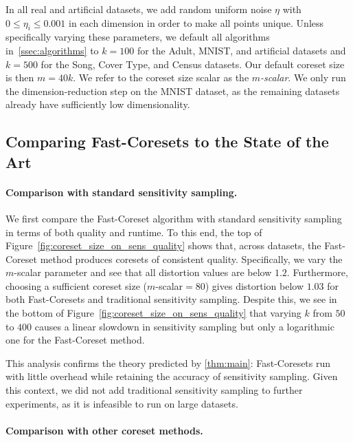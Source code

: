 In all real and artificial datasets, we add random uniform noise $\eta$ with $0 \leq \eta_i \leq 0.001$ in each dimension in order to make all points unique.
Unless specifically varying these parameters, we default all algorithms in~\ref{ssec:algorithms} to $k=100$ for the Adult, MNIST, and artificial datasets and
$k=500$ for the Song, Cover Type, and Census datasets. Our default coreset size is then $m = 40k$. We refer to the coreset size scalar as the \emph{$m$-scalar}.
We only run the dimension-reduction step on the MNIST dataset, as the remaining datasets already have sufficiently low dimensionality.


\subsection{Comparing Fast-Coresets to the State of the Art}
\label{ssec:alg_qualities}


\paragraph*{Comparison with standard sensitivity sampling.}



We first compare the Fast-Coreset algorithm with standard sensitivity sampling in terms of both quality and runtime.  To this end, the top of
Figure~\ref{fig:coreset_size_on_sens_quality} shows that, across datasets, the Fast-Coreset method produces coresets of consistent quality. Specifically, we
vary the $m$-scalar parameter and see that all distortion values are below $1.2$. Furthermore, choosing a sufficient coreset size ($m$-scalar$=80$) gives
distortion below $1.03$ for both Fast-Coresets and traditional sensitivity sampling. Despite this, we see in the bottom of
Figure~\ref{fig:coreset_size_on_sens_quality} that
varying $k$ from $50$ to $400$ causes a linear slowdown in sensitivity sampling but only a logarithmic one for the Fast-Coreset method.

This analysis confirms the theory predicted by \cref{thm:main}: Fast-Coresets run with little overhead while retaining the accuracy of sensitivity sampling.
Given this context, we did not add traditional sensitivity sampling to further experiments, as it is infeasible to run on large datasets.


\paragraph*{Comparison with other coreset methods.}


